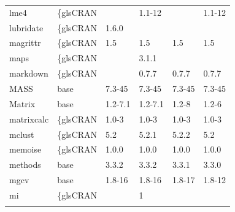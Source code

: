 \begin{longtable}{llllll}
\rowcolor{black!5}
lme4                          & \{gls{CRAN}                      &             & 1.1-12      &                & 1.1-12             \\
\rowcolor{black!10}
lubridate                     & \{gls{CRAN}                      & 1.6.0       &             &                &                   \\
\rowcolor{black!5}
magrittr                      & \{gls{CRAN}                      & 1.5         & 1.5         & 1.5            & 1.5                \\
\rowcolor{black!10}
maps                          & \{gls{CRAN}                      &             & 3.1.1       &                &                   \\
\rowcolor{black!5}
markdown                      & \{gls{CRAN}                      &             & 0.7.7       & 0.7.7          & 0.7.7              \\
\rowcolor{black!10}
MASS                          & base                      & 7.3-45      & 7.3-45      & 7.3-45         & 7.3-45            \\
\rowcolor{black!5}
Matrix                        & base                      & 1.2-7.1     & 1.2-7.1     & 1.2-8          & 1.2-6              \\
\rowcolor{black!10}
matrixcalc                    & \{gls{CRAN}                      & 1.0-3       & 1.0-3       & 1.0-3          & 1.0-3             \\
\rowcolor{black!5}
mclust                        & \{gls{CRAN}                      & 5.2         & 5.2.1       & 5.2.2          & 5.2                \\
\rowcolor{black!10}
memoise                       & \{gls{CRAN}                      & 1.0.0       & 1.0.0       & 1.0.0          & 1.0.0             \\
\rowcolor{black!5}
methods                       & base                      & 3.3.2       & 3.3.2       & 3.3.1          & 3.3.0              \\
\rowcolor{black!10}
mgcv                          & base                      & 1.8-16      & 1.8-16      & 1.8-17         & 1.8-12            \\
\rowcolor{black!5}
mi                            & \{gls{CRAN}                      &             & 1           &                &                    \\
\rowcolor{black!10}

\end{longtable}
